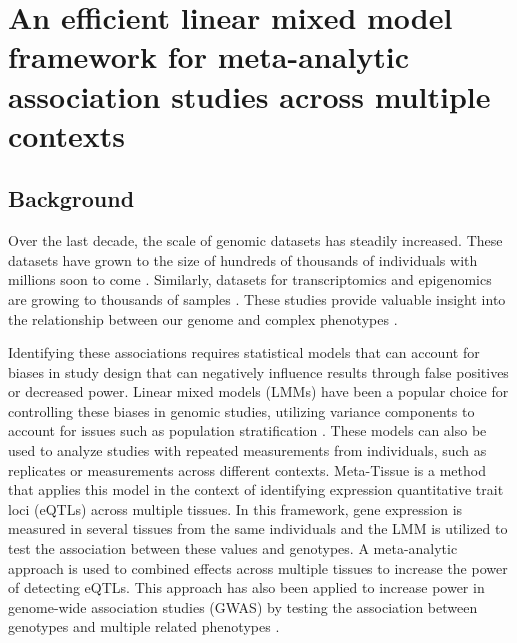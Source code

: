 \chapter{An efficient linear mixed model framework for meta-analytic association studies across multiple contexts}

\section{Background}

    Over the last decade, the scale of genomic datasets has steadily increased. These datasets have grown to the size of hundreds of thousands of individuals \cite{Bycroft2018} with millions soon to come \cite{allofus}. Similarly, datasets for transcriptomics and epigenomics are growing to thousands of samples \cite{gtex, GTEx_Consortium2020-xx, ewas}. These studies provide valuable insight into the relationship between our genome and complex phenotypes \cite{gwas}. 
    
    Identifying these associations requires statistical models that can account for biases in study design that can negatively influence results through false positives or decreased power. Linear mixed models (LMMs) have been a popular choice for controlling these biases in genomic studies, utilizing variance components to account for issues such as population stratification \cite{Kang}. These models can also be used to analyze studies with repeated measurements from individuals, such as replicates or measurements across different contexts. Meta-Tissue  \cite{Sul} is a method that applies this model in the context of identifying expression quantitative trait loci (eQTLs) across multiple tissues. In this framework, gene expression is measured in several tissues from the same individuals and the LMM is utilized to test the association between these values and genotypes. A meta-analytic approach is used to combined effects across multiple tissues to increase the power of detecting eQTLs. This approach has also been applied to increase power in genome-wide association studies (GWAS) by testing the association between genotypes and multiple related phenotypes \cite{Joo}. 
    
